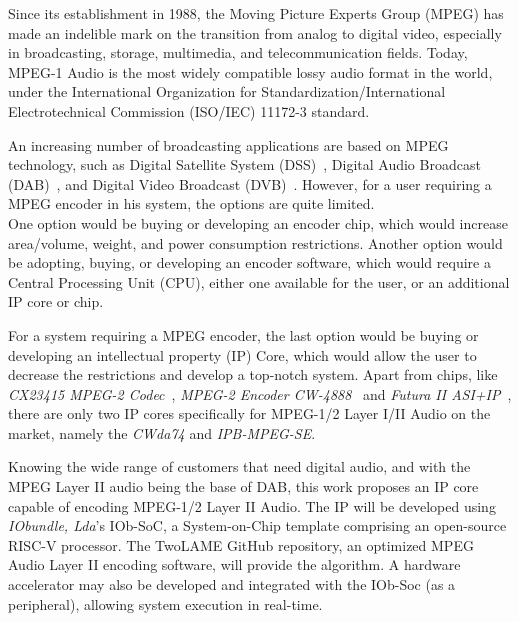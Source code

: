 

Since its establishment in 1988, the Moving Picture Experts Group (MPEG) has made an indelible mark on the transition from analog to digital video, especially in broadcasting, storage, multimedia, and telecommunication fields.
Today, MPEG-1 Audio is the most widely compatible lossy audio format in the world, under the International Organization for Standardization/International Electrotechnical Commission (ISO/IEC) 11172-3 standard.

An increasing number of broadcasting applications are based on MPEG technology, such as Digital Satellite System (DSS)~\cite{dss}, Digital Audio Broadcast (DAB)~\cite{dab}, and Digital Video Broadcast (DVB)~\cite{dvb}. However, for a user requiring a MPEG encoder in his system, the options are quite limited.\\
One option would be buying or developing an encoder chip, which would increase area/volume, weight, and power consumption restrictions. 
Another option would be adopting, buying, or developing an encoder software, which would require a Central Processing Unit (CPU), either one available for the user, or an additional IP core or chip. 

For a system requiring a MPEG encoder, the last option would be buying or developing an intellectual property (IP) Core, which would allow the user to decrease the restrictions and develop a top-notch system.
Apart from chips, like \textit{CX23415 MPEG-2 Codec}~\cite{cx23415}, \textit{MPEG-2 Encoder CW-4888}~\cite{cw4888} and \textit{Futura II ASI+IP}~\cite{futura}, there are only two IP cores specifically for MPEG-1/2 Layer I/II Audio on the market, namely the \textit{CWda74} and \textit{IPB-MPEG-SE}.

Knowing the wide range of customers that need digital audio, and with the MPEG Layer II audio being the base of DAB, this work proposes an IP core capable of encoding MPEG-1/2 Layer II Audio. 
The IP will be developed using \textit{IObundle, Lda}'s IOb-SoC, a System-on-Chip template comprising an open-source RISC-V processor. The TwoLAME GitHub repository, an optimized MPEG Audio Layer II encoding software, will provide the algorithm.
A hardware accelerator may also be developed and integrated with the IOb-Soc (as a peripheral), allowing system execution in real-time.